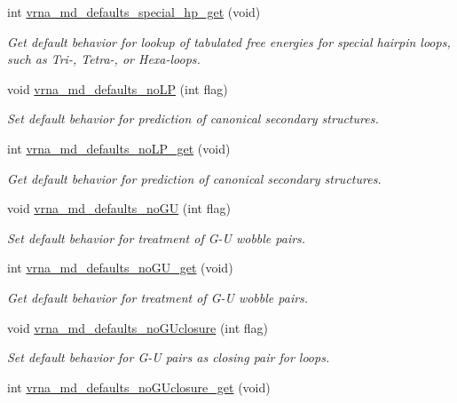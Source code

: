 \begin{DoxyCompactItemize}
int \hyperlink{group__model__details_ga1d68a6efdaa1253cc63fd9cd06452559}{vrna\+\_\+md\+\_\+defaults\+\_\+special\+\_\+hp\+\_\+get} (void)
\begin{DoxyCompactList}\small\item\em Get default behavior for lookup of tabulated free energies for special hairpin loops, such as Tri-\/, Tetra-\/, or Hexa-\/loops. \end{DoxyCompactList}\item 
void \hyperlink{group__model__details_ga2f88ffc393ac9d7987849c965fd29ea8}{vrna\+\_\+md\+\_\+defaults\+\_\+no\+LP} (int flag)
\begin{DoxyCompactList}\small\item\em Set default behavior for prediction of canonical secondary structures. \end{DoxyCompactList}\item 
int \hyperlink{group__model__details_ga934344888fbacaed538bbbfe910f2aa6}{vrna\+\_\+md\+\_\+defaults\+\_\+no\+L\+P\+\_\+get} (void)
\begin{DoxyCompactList}\small\item\em Get default behavior for prediction of canonical secondary structures. \end{DoxyCompactList}\item 
void \hyperlink{group__model__details_ga98218f85c7a957a1d1ddf4627fdf5a39}{vrna\+\_\+md\+\_\+defaults\+\_\+no\+GU} (int flag)
\begin{DoxyCompactList}\small\item\em Set default behavior for treatment of G-\/U wobble pairs. \end{DoxyCompactList}\item 
int \hyperlink{group__model__details_ga5faa7d4e536d7fe36ec25428c0cf2563}{vrna\+\_\+md\+\_\+defaults\+\_\+no\+G\+U\+\_\+get} (void)
\begin{DoxyCompactList}\small\item\em Get default behavior for treatment of G-\/U wobble pairs. \end{DoxyCompactList}\item 
void \hyperlink{group__model__details_gade5b9951d71ca2fb357a4e6c0c18ccd1}{vrna\+\_\+md\+\_\+defaults\+\_\+no\+G\+Uclosure} (int flag)
\begin{DoxyCompactList}\small\item\em Set default behavior for G-\/U pairs as closing pair for loops. \end{DoxyCompactList}\item 
int \hyperlink{group__model__details_ga4f7fdad083243a5348d63320ddaa70f3}{vrna\+\_\+md\+\_\+defaults\+\_\+no\+G\+Uclosure\+\_\+get} (void)

\end{DoxyCompactItemize}
